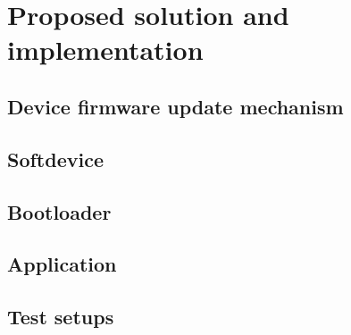 \section{Proposed solution and implementation}

\subsection{Device firmware update mechanism}

\subsection{Softdevice}

\subsection{Bootloader}

\subsection{Application}

\subsection{Test setups}